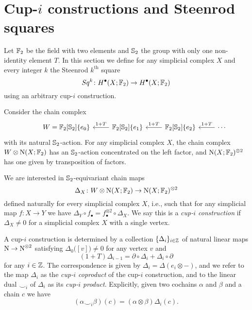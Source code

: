 
\section{Cup-\texorpdfstring{$i$}{i} constructions and Steenrod squares} \label{s:squares}

Let $\Ftwo$ be the field with two elements and $\S_2$ the group with only one non-identity element $T$.
In this section we define for any simplicial complex $X$ and every integer $k$ the Steenrod $k^{\mathrm{th}}$ square
\begin{equation*}
Sq^k \colon H^\bullet(X; \Ftwo) \to H^{\bullet}(X; \Ftwo)
\end{equation*}
using an arbitrary cup-$i$ construction.

Consider the chain complex
\begin{equation*}
\begin{tikzcd}[column sep=normal]
& W =  \Ftwo[\S_2]\{e_0\} & \arrow[l, "1+T"'] \Ftwo[\S_2]\{e_1\} & \arrow[l, "1+T"']
\Ftwo[\S_2]\{e_2\} & \arrow[l, "1+T"'] \cdots
\end{tikzcd}
\end{equation*}
with its natural $\S_2$-action.
For any simplicial complex $X$, the chain complex $W \otimes \chains(X; \Ftwo)$ has an $\S_2$-action concentrated on the left factor, and $\chains(X; \Ftwo)^{\otimes 2}$ has one given by transposition of factors.

We are interested in $\S_2$-equivariant chain maps
\begin{equation} \label{e:steenrod diagonal}
\Delta_X \colon W \otimes \chains(X; \Ftwo) \to \chains(X; \Ftwo)^{\otimes 2}
\end{equation}
defined naturally for every simplicial complex $X$, i.e., such that for any simplicial map $f \colon X \to Y$ we have $\Delta_Y \circ f_\bullet = f_\bullet^{\otimes 2} \circ \Delta_X$.
We say this is a \textit{cup-$i$ construction} if $\Delta_X \neq 0$ for a simplicial complex $X$ with a single vertex.

A cup-$i$ construction is determined by a collection $\{\Delta_i\}_{i \in \Z}$ of natural linear maps $\chains \to \chains^{\otimes 2}$ satisfying $\Delta_0 \big([v]\big) \neq 0$ for any vertex $v$ and
\begin{equation} \label{e:boundary of cup-i}
(1 + T) \Delta_{i-1} = \partial \circ \Delta_i + \Delta_i \circ \partial
\end{equation}
for any $i \in \Z$.
The correspondence is given by $\Delta_i = \Delta(e_i \otimes -)$, and we refer to the map $\Delta_i$ as the \textit{cup-$i$ coproduct} of the cup-$i$ construction, and to the linear dual $\smallsmile_i$ of $\Delta_i$ as its \textit{cup-$i$ product}.
Explicitly, given two cochains $\alpha$ and $\beta$ and a chain $c$ we have
\begin{equation*}
(\alpha \smallsmile_i \beta)(c) = (\alpha \otimes \beta) \Delta_i(c).
\end{equation*}

